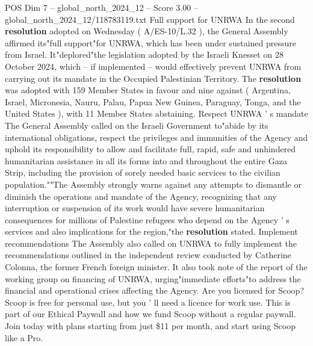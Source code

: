 \begin{textsample}{POS Dim 7 – global\_north\_2024\_12 – Score 3.00 – global\_north\_2024\_12/118783119.txt}
Full support for UNRWA In the second \textbf{resolution} adopted on Wednesday ( A/ES-10/L.32 ), the General Assembly affirmed its"full support"for UNRWA, which has been under sustained pressure from Israel.
It"deplored"the legislation adopted by the Israeli Knesset on 28 October 2024, which -- if implemented -- would effectively prevent UNRWA from carrying out its mandate in the Occupied Palestinian Territory.
The \textbf{resolution} was adopted with 159 Member States in favour and nine against ( Argentina, Israel, Micronesia, Nauru, Palau, Papua New Guinea, Paraguay, Tonga, and the United States ), with 11 Member States abstaining.
Respect UNRWA ' s mandate The General Assembly called on the Israeli Government to"abide by its international obligations, respect the privileges and immunities of the Agency and uphold its responsibility to allow and facilitate full, rapid, safe and unhindered humanitarian assistance in all its forms into and throughout the entire Gaza Strip, including the provision of sorely needed basic services to the civilian population.""The Assembly strongly warns against any attempts to dismantle or diminish the operations and mandate of the Agency, recognizing that any interruption or suspension of its work would have severe humanitarian consequences for millions of Palestine refugees who depend on the Agency ' s services and also implications for the region,"the \textbf{resolution} stated.
Implement recommendations The Assembly also called on UNRWA to fully implement the recommendations outlined in the independent review conducted by Catherine Colonna, the former French foreign minister.
It also took note of the report of the working group on financing of UNRWA, urging"immediate efforts"to address the financial and operational crises affecting the Agency.
Are you licensed for Scoop?
Scoop is free for personal use, but you ' ll need a licence for work use.
This is part of our Ethical Paywall and how we fund Scoop without a regular paywall.
Join today with plans starting from just \$11 per month, and start using Scoop like a Pro.

\end{textsample}
